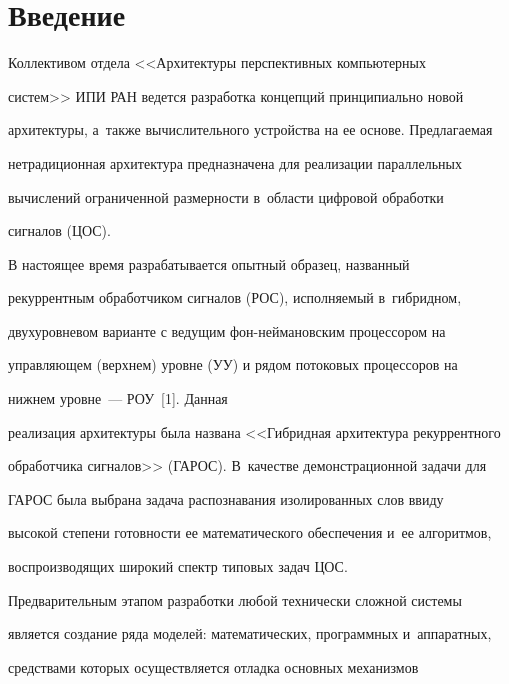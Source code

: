 




      \thispagestyle{headings}

      

      \section{Введение}

  

  Коллективом отдела <<Архитектуры перспективных компьютерных 

систем>> ИПИ РАН ведется разработка концепций принципиально новой 

архитектуры, а~также вычислительного устройства на ее основе. Предлагаемая 

нетрадиционная архитектура предназначена для реализации параллельных 

вычислений ограниченной размерности в~об\-ласти цифровой обработки 

сигналов (ЦОС). 

  

  В настоящее время разрабатывается опытный образец, названный 

рекуррентным обработчиком сигналов (РОС), исполняемый в~гибридном, 

двухуровневом варианте с ведущим фон-неймановским процессором на 

управляющем (верхнем) уровне (УУ) и рядом потоковых процессоров на 

нижнем уровне~--- РОУ~[1]. Данная 

реализация архитектуры была названа <<Гибридная архитектура рекуррентного 

обработчика сигналов>> (ГАРОС). В~качестве демонстрационной задачи для 

ГАРОС была выбрана задача распознавания изолированных слов ввиду 

высокой степени готовности ее математического обеспечения и~ее алгоритмов, 

воспроизводящих широкий спектр типовых задач ЦОС.

  

  Предварительным этапом разработки любой технически сложной системы 

является создание ряда моделей: математических, программных и~аппаратных, 

средствами которых осуществляется отладка основных механизмов 

